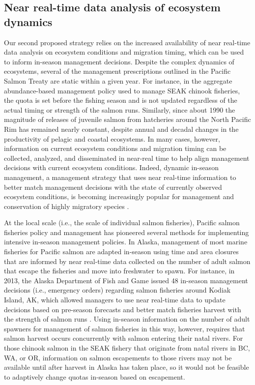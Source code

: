 \subsection{Near real-time data analysis of ecosystem dynamics}

Our second proposed strategy relies on the increased availability of
near real-time data analysis on ecosystem conditions and migration
timing, which can be used to inform in-season management decisions.
Despite the complex dynamics of ecosystems, several of the management
prescriptions outlined in the Pacific Salmon Treaty are static within a
given year. For instance, in the aggregate abundance-based management
policy used to manage SEAK chinook fisheries, the quota is set before
the fishing season and is not updated regardless of the actual timing or
strength of the salmon runs. Similarly, since about 1990 the magnitude
of releases of juvenile salmon from hatcheries around the North Pacific
Rim has remained nearly constant, despite annual and decadal changes in
the productivity of pelagic and coastal ecosystems. In many cases,
however, information on current ecosystem conditions and migration
timing can be collected, analyzed, and disseminated in near-real time to
help align management decisions with current ecosystem conditions.
Indeed, dynamic in-season management, a management strategy that uses
near real-time information to better match management decisions with the
state of currently observed ecosystem conditions, is becoming
increasingly popular for management and conservation of highly migratory
species \citep{Maxwell2015, Lewison2015}.

At the local scale (i.e., the scale of individual salmon fisheries),
Pacific salmon fisheries policy and management has pioneered several
methods for implementing intensive in-season management policies. In
Alaska, management of most marine fisheries for Pacific salmon are
adapted in-season using time and area closures that are informed by near
real-time data collected on the number of adult salmon that escape the
fisheries and move into freshwater to spawn. For instance, in 2013, the
Alaska Department of Fish and Game issued 48 in-season management
decisions (i.e., emergency orders) regarding salmon fisheries around
Kodiak Island, AK, which allowed managers to use near real-time data to
update decisions based on pre-season forecasts and better match
fisheries harvest with the strength of salmon runs \citep{Jackson2013}.
Using in-season information on the number of adult spawners for
management of salmon fisheries in this way, however, requires that
salmon harvest occurs concurrently with salmon entering their natal
rivers. For those chinook salmon in the SEAK fishery that originate from
natal rivers in BC, WA, or OR, information on salmon escapements to
those rivers may not be available until after harvest in Alaska has
taken place, so it would not be feasible to adaptively change quotas
in-season based on escapement.


